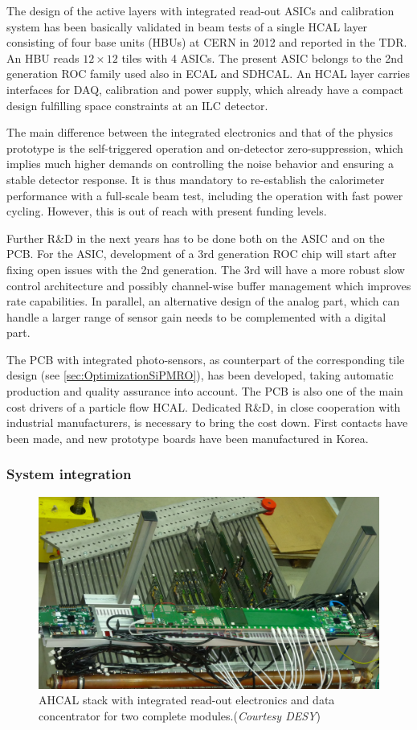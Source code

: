 The design of the active layers with integrated read-out ASICs and calibration system has been basically validated in beam tests of a single HCAL layer consisting of four base units (HBUs) at CERN in 2012 and reported in the TDR. An HBU reads $12 \times 12$ tiles with 4 ASICs. The present ASIC belongs to the 2nd generation ROC family used also in ECAL and SDHCAL. An HCAL layer carries interfaces for DAQ, calibration and power supply, which already have a compact design fulfilling space constraints at an ILC detector.

The main difference between the integrated electronics and that of the physics prototype is the self-triggered operation and on-detector zero-suppression, which implies much higher demands on controlling the noise behavior and ensuring a stable detector response. It is thus mandatory to re-establish the calorimeter performance with a full-scale beam test, including the operation with fast power cycling. However, this is out of reach with present funding levels.

Further R\&D in the next years has to be done both on the ASIC and on the PCB. For the ASIC, development of a 3rd generation ROC chip will start after fixing open issues with the 2nd generation. The 3rd will have a more robust slow control architecture and possibly channel-wise buffer management which improves rate capabilities. In parallel, an alternative design of the analog part, which can handle a larger range of sensor gain needs to be complemented with a digital part.

The PCB with integrated photo-sensors, as counterpart of the corresponding tile design (see \ref{sec:OptimizationSiPMRO}), has been developed, taking automatic production and quality assurance into account. The PCB is also one of the main cost drivers of a particle flow HCAL. Dedicated R\&D, in close cooperation with industrial manufacturers, is necessary to bring the cost down. First contacts have been made, and new prototype boards have been manufactured in Korea.

\subsubsection{System integration}

\begin{figure}
	\centering
	\includegraphics[width=.5\textwidth]{Calorimeter/AHCAL/AHCAL_Stack}
	\caption{AHCAL stack with integrated read-out electronics and data concentrator for two complete modules.({\it Courtesy DESY})}
	\label{fig:Calorimeter:AHCAL:Stack}
\end{figure}


